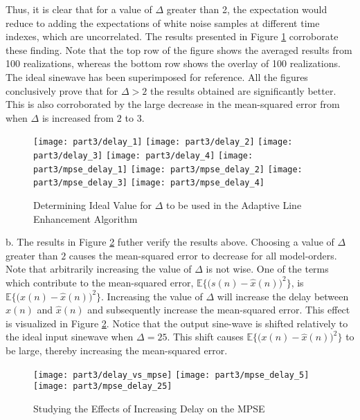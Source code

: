 \noindent{}Thus, it is clear that for a value of $\Delta$ greater than 2, the expectation would reduce to adding the expectations of white noise samples at different time indexes, which are uncorrelated. The results presented in Figure \ref{fig:ale} corroborate these finding. Note that the top row of the figure shows the averaged results from 100 realizations, whereas the bottom row shows the overlay of 100 realizations. The ideal sinewave has been superimposed for reference. All the figures conclusively prove that for $\Delta>2$ the results obtained are significantly better. This is also corroborated by the large decrease in the mean-squared error from when $\Delta$ is increased from $2$ to $3$.

\begin{figure}[H]
\centering{}
\texttt{[image: part3/delay\_1]}
\texttt{[image: part3/delay\_2]}
\texttt{[image: part3/delay\_3]}
\texttt{[image: part3/delay\_4]}
\texttt{[image: part3/mpse\_delay\_1]}
\texttt{[image: part3/mpse\_delay\_2]}
\texttt{[image: part3/mpse\_delay\_3]}
\texttt{[image: part3/mpse\_delay\_4]}
\caption{Determining Ideal Value for $\Delta$ to be used in the Adaptive Line Enhancement Algorithm}
\label{fig:ale}
\end{figure}


\noindent{}b. The results in Figure \ref{fig:ale_delay} futher verify the results above. Choosing a value of $\Delta$ greater than $2$ causes the mean-squared error to decrease for all model-orders. Note that arbitrarily increasing the value of $\Delta$ is not wise. One of the terms which contribute to the mean-squared error, $\mathbb{E}\bigg\{\bigg(s(n)-\hat{x}(n)\bigg)^2\bigg\}$, is $\mathbb{E}\bigg\{\bigg(x(n)-\hat{x}(n)\bigg)^2\bigg\}$. Increasing the value of $\Delta$ will increase the delay between $x(n)$ and $\hat{x}(n)$ and subsequently increase the mean-squared error. This effect is visualized in Figure \ref{fig:ale_delay}. Notice that the output sine-wave is shifted relatively to the ideal input sinewave when $\Delta=25$. This shift causes $\mathbb{E}\bigg\{\bigg(x(n)-\hat{x}(n)\bigg)^2\bigg\}$ to be large, thereby increasing the mean-squared error.

\begin{figure}[H]
\centering{}
\texttt{[image: part3/delay\_vs\_mpse]}
\texttt{[image: part3/mpse\_delay\_5]}
\texttt{[image: part3/mpse\_delay\_25]}
\caption{Studying the Effects of Increasing Delay on the MPSE}
\label{fig:ale_delay}
\end{figure}


